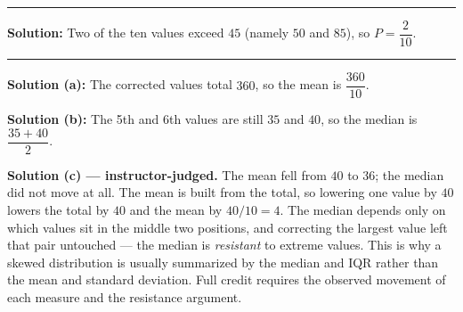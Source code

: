 \documentclass[12pt]{article}
\begin{document}
\vspace{0.15cm}\noindent\rule{\linewidth}{0.2pt}\vspace{0.15cm}


\textbf{Solution:} \quad Two of the ten values exceed $45$ (namely $50$ and $85$), so
$P = \dfrac{2}{10}$. 

\vspace{0.15cm}\noindent\rule{\linewidth}{0.2pt}\vspace{0.15cm}


\textbf{Solution (a):} \quad The corrected values total $360$, so the mean is
$\dfrac{360}{10}$. 

\textbf{Solution (b):} \quad The 5th and 6th values are still $35$ and $40$, so the median is
$\dfrac{35+40}{2}$. 

\textbf{Solution (c) --- instructor-judged.} \quad The mean fell from $40$ to $36$; the median
did not move at all. The mean is built from the total, so lowering one value by $40$ lowers the
total by $40$ and the mean by $40/10 = 4$. The median depends only on which values sit in the
middle two positions, and correcting the largest value left that pair untouched --- the median
is \emph{resistant} to extreme values. This is why a skewed distribution is usually summarized
by the median and IQR rather than the mean and standard deviation. Full credit requires the
observed movement of each measure and the resistance argument.
\end{document}
